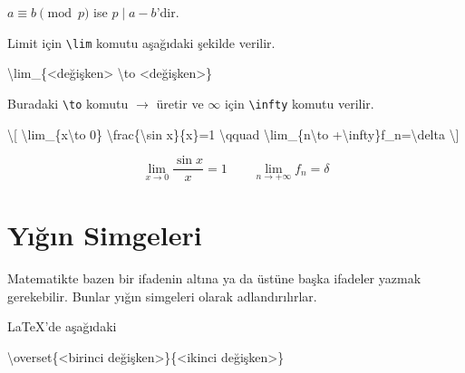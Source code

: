 \documentclass[
  10pt,
]{scrbook}
\newenvironment{Shaded}{}{}
\newcommand{\FunctionTok}[1]{\textcolor[rgb]{0.02,0.16,0.49}{#1}}
\newcommand{\NormalTok}[1]{#1}
\newcommand{\SpecialCharTok}[1]{\textcolor[rgb]{0.25,0.44,0.63}{#1}}
\newcommand{\SpecialStringTok}[1]{\textcolor[rgb]{0.73,0.40,0.53}{#1}}
\theoremstyle{definition}
\theoremstyle{definition}
\theoremstyle{definition}
\theoremstyle{definition}
\theoremstyle{remark}
\begin{document}
\(a\equiv b\pmod p\) ise \(p\mid a-b\)'dir.

Limit için \texttt{\textbackslash{}lim} komutu aşağıdaki şekilde verilir.

\begin{Shaded}
\begin{Highlighting}[]
\FunctionTok{\textbackslash{}lim}\NormalTok{\_\{\textless{}değişken\textgreater{} }\FunctionTok{\textbackslash{}to}\NormalTok{ \textless{}değişken\textgreater{}\}}
\end{Highlighting}
\end{Shaded}

Buradaki \texttt{\textbackslash{}to} komutu \(\to\) üretir ve \(\infty\) için \texttt{\textbackslash{}infty} komutu verilir.

\begin{Shaded}
\begin{Highlighting}[]
\SpecialStringTok{\textbackslash{}[}
\SpecialCharTok{\textbackslash{}lim}\SpecialStringTok{\_\{x}\SpecialCharTok{\textbackslash{}to}\SpecialStringTok{ 0\}}
\SpecialCharTok{\textbackslash{}frac}\SpecialStringTok{\{}\SpecialCharTok{\textbackslash{}sin}\SpecialStringTok{ x\}\{x\}=1 }\SpecialCharTok{\textbackslash{}qquad}
\SpecialCharTok{\textbackslash{}lim}\SpecialStringTok{\_\{n}\SpecialCharTok{\textbackslash{}to}\SpecialStringTok{ +}\SpecialCharTok{\textbackslash{}infty}\SpecialStringTok{\}f\_n=}\SpecialCharTok{\textbackslash{}delta}
\SpecialStringTok{\textbackslash{}]}
\end{Highlighting}
\end{Shaded}

\[
\lim_{x\to 0}
\frac{\sin x}{x}=1 \qquad
\lim_{n\to +\infty}f_n=\delta
\]

\hypertarget{yux131ux11fux131n-simgeleri}{%
\section{Yığın Simgeleri}\label{yux131ux11fux131n-simgeleri}}

Matematikte bazen bir ifadenin altına ya da üstüne başka ifadeler yazmak gerekebilir. Bunlar yığın simgeleri olarak adlandırılırlar.

LaTeX'de aşağıdaki

\begin{Shaded}
\begin{Highlighting}[]
\FunctionTok{\textbackslash{}overset}\NormalTok{\{\textless{}birinci değişken\textgreater{}\}\{\textless{}ikinci değişken\textgreater{}\}}
\end{Highlighting}
\end{Shaded}
\end{document}
